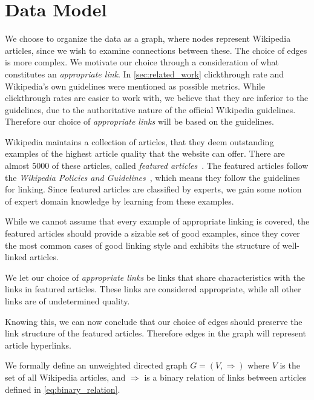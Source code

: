 \section{Data Model}\label{sec:choice_of_graph}
We choose to organize the data as a graph, where nodes represent Wikipedia articles, since we wish to examine connections between these. The choice of edges is more complex. We motivate our choice through a consideration of what constitutes an \emph{appropriate link}. In \cref{sec:related_work} clickthrough rate and Wikipedia's own guidelines were mentioned as possible metrics. While clickthrough rates are easier to work with, we believe that they are inferior to the guidelines, due to the authoritative nature of the official Wikipedia guidelines. Therefore our choice of \emph{appropriate links} will be based on the guidelines.

Wikipedia maintains a collection of articles, that they deem outstanding examples of the highest article quality that the website can offer. There are almost 5000 of these articles, called \emph{featured articles}~\cite{wiki-featured-articles}. The featured articles follow the \emph{Wikipedia Policies and Guidelines}~\cite{wiki-editor-guidelines}, which means they follow the guidelines for linking. Since featured articles are classified by experts, we gain some notion of expert domain knowledge by learning from these examples.

While we cannot assume that every example of appropriate linking is covered, the featured articles should provide a sizable set of good examples,
since they cover the most common cases of good linking style and exhibits the structure of well-linked articles.

We let our choice of \emph{appropriate links} be links that share characteristics with the links in featured articles. These links are considered appropriate, while all other links are of undetermined quality. 

Knowing this, we can now conclude that our choice of edges should preserve the link structure of the featured articles. Therefore edges in the graph will represent article hyperlinks. 

We formally define an unweighted directed graph $G = (V,\Rightarrow)$ where $V$ is the set of all Wikipedia articles, and $\Rightarrow$ is a binary relation of links between articles defined in \cref{eq:binary_relation}.

